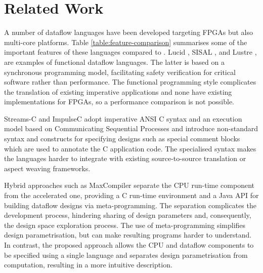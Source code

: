 \section{Related Work}

A number of dataflow languages have been developed targeting FPGAs but
also multi-core platforms. Table \ref{table:feature-comparison}
summarises some of the important features of these languages compared
to \MAXC{}. Lucid \cite{ashcroft1977lucid}, SISAL
\cite{gurd1987implicit}, \cite{mcgraw1983sisal} and Lustre
\cite{halbwachs1991synchronous}, are examples of functional dataflow
languages. The latter is based on a synchronous programming model,
facilitating safety verification for critical software
\cite{halbwachs1992programming} rather than performance. The
functional programming style complicates the translation of existing
imperative applications and none have existing implementations for
FPGAs, so a performance comparison is not possible.

Streams-C\cite{Gokhale:Stone:Arnold:Kalinowski:2000} and
ImpulseC\cite{ImpulseC} adopt imperative ANSI C syntax and an
execution model based on Communicating Sequential Processes and
introduce non-standard syntax and constructs for specifying designs
such as special comment blocks which are used to annotate the C
application code. The specialised syntax makes the languages harder to
integrate with existing source-to-source translation or aspect weaving
frameworks.

Hybrid approaches such as MaxCompiler\cite{5719584} separate the CPU
run-time component from the accelerated one, providing a C run-time
environment and a Java API for building dataflow designs via
meta-programming. The separation complicates the development process,
hindering sharing of design parameters and, consequently, the design
space exploration process. The use of meta-programming simplifies
design parametrisation, but can make resulting programs harder to
understand. In contrast, the proposed approach allows the CPU and
dataflow components to be specified using a single language and
separates design parametrisation from computation, resulting in a more
intuitive description.


